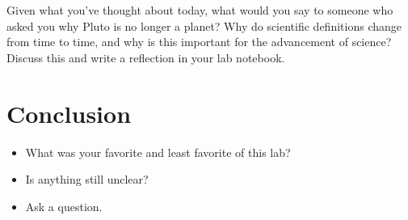 \documentclass[12pt]{article}
\begin{document}
\noindent Given what you've thought about today, what would you say to someone who asked you why Pluto is no longer a planet? Why do scientific definitions change from time to time, and why is this important for the advancement of science? Discuss this and write a reflection in your lab notebook.

\section*{Conclusion}

\begin{itemize}
    \item What was your favorite and least favorite of this lab?
    \item Is anything still unclear?
    \item Ask a question. 
\end{itemize}
\end{document}
